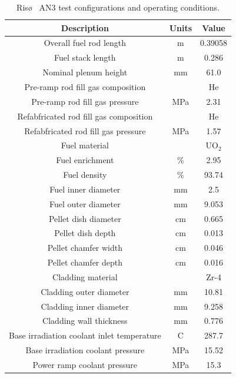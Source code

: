 \begin{table} 
\caption{Ris\o~ AN3 test configurations and operating conditions.}
\label{table:riso_specs} 
\centering
\begin{tabular}{||c|c|c||} 
\hline \hline
\textbf{Description} & \textbf{Units} & \textbf{Value} \\ \hline
Overall fuel rod length & m  & 0.39058 \\ \hline
Fuel stack length        & m &  0.286 \\ \hline
Nominal plenum height  & mm & 61.0  \\ \hline
Pre-ramp rod fill gas composition & & He \\ \hline
Pre-ramp rod fill gas pressure & MPa & 2.31 \\ \hline
Refabfricated rod fill gas composition & & He \\ \hline
Refabfricated rod fill gas pressure & MPa & 1.57 \\ \hline
Fuel material    & & UO$_2$ \\ \hline
Fuel enrichment & \% & 2.95 \\ \hline
Fuel density      & \% & 93.74 \\ \hline
Fuel inner diameter   & mm & 2.5 \\ \hline
Fuel outer diameter   & mm & 9.053 \\ \hline
Pellet dish diameter   & cm & 0.665 \\ \hline
Pellet dish depth       & cm & 0.013 \\ \hline
Pellet chamfer width  & cm & 0.046 \\ \hline
Pellet chamfer depth  & cm & 0.016 \\ \hline
Cladding material          &  & Zr-4 \\ \hline
Cladding outer diameter  & mm & 10.81 \\ \hline
Cladding inner diameter   & mm & 9.258 \\ \hline
Cladding wall thickness   & mm &  0.776 \\ \hline
Base irradiation coolant inlet temperature & C & 287.7 \\ \hline
Base irradiation coolant pressure & MPa & 15.52  \\ \hline 
Power ramp coolant pressure & MPa & 15.3  \\ 
\hline \hline
\end{tabular}
\end{table}


